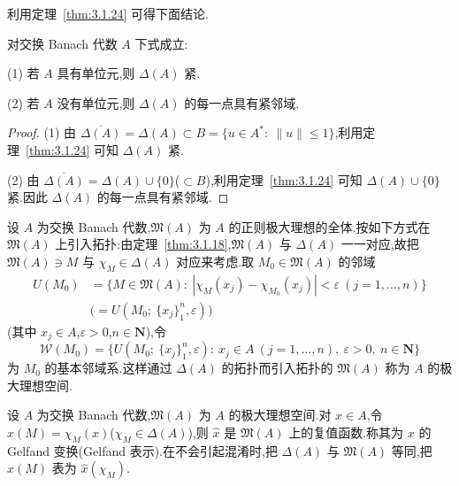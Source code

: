 利用定理~\ref{thm:3.1.24} 可得下面结论.

\begin{corollary}\label{cor:3.1.25}
对交换 Banach 代数 $A$ 下式成立:

(1) 若 $A$ 具有单位元,则 $\Delta(A)$ 紧.

(2) 若 $A$ 没有单位元,则 $\Delta(A)$ 的每一点具有紧邻域.
\end{corollary}

\begin{proof}
(1) 由 $\overline{\Delta(A)} = \Delta(A) \subset B = \{u \in A^{*}:\ \|u\| \leq 1\}$,利用定理~\ref{thm:3.1.24} 可知 $\Delta(A)$ 紧.

(2) 由 $\overline{\Delta(A)} = \Delta(A) \cup \{0\}$($\subset B$),利用定理~\ref{thm:3.1.24} 可知 $\Delta(A) \cup \{0\}$ 紧.因此 $\Delta(A)$ 的每一点具有紧邻域.
\end{proof}

\begin{definition}\label{def:3.1.26}
设 $A$ 为交换 Banach 代数,$\mathfrak{M}(A)$ 为 $A$ 的正则极大理想的全体.按如下方式在 $\mathfrak{M}(A)$ 上引入拓扑:由定理~\ref{thm:3.1.18},$\mathfrak{M}(A)$ 与 $\Delta(A)$ 一一对应,故把 $\mathfrak{M}(A) \ni M$ 与 $\chi_{M} \in \Delta(A)$ 对应来考虑.取 $M_{0} \in \mathfrak{M}(A)$ 的邻域
\begin{equation*}
\begin{aligned}
U(M_{0}) &= \{M \in \mathfrak{M}(A):\ |\chi_{M}(x_{j}) - \chi_{M_{0}}(x_{j})| < \varepsilon\ (j = 1, \ldots, n)\} \\
&\bigl(= U(M_{0};\ \{x_{j}\}_{1}^{n}, \varepsilon)\bigr)
\end{aligned}
\end{equation*}
(其中 $x_{j} \in A$,$\varepsilon > 0$,$n \in \mathbf{N}$),令
\begin{equation*}
\mathcal{W}(M_{0}) = \{U(M_{0};\ \{x_{j}\}_{1}^{n}, \varepsilon):\ x_{j} \in A\ (j = 1, \ldots, n),\ \varepsilon > 0,\ n \in \mathbf{N}\}
\end{equation*}
为 $M_{0}$ 的基本邻域系.这样通过 $\Delta(A)$ 的拓扑而引入拓扑的 $\mathfrak{M}(A)$ 称为 $A$ 的极大理想空间.
\end{definition}

\begin{definition}\label{def:3.1.27}
设 $A$ 为交换 Banach 代数,$\mathfrak{M}(A)$ 为 $A$ 的极大理想空间.对 $x \in A$,令 $\hat{x}(M) = \chi_{M}(x)$($\chi_{M} \in \Delta(A)$),则 $\hat{x}$ 是 $\mathfrak{M}(A)$ 上的复值函数.称其为 $x$ 的 Gelfand 变换(Gelfand 表示).在不会引起混淆时,把 $\Delta(A)$ 与 $\mathfrak{M}(A)$ 等同,把 $\hat{x}(M)$ 表为 $\hat{x}(\chi_{M})$.
\end{definition}

